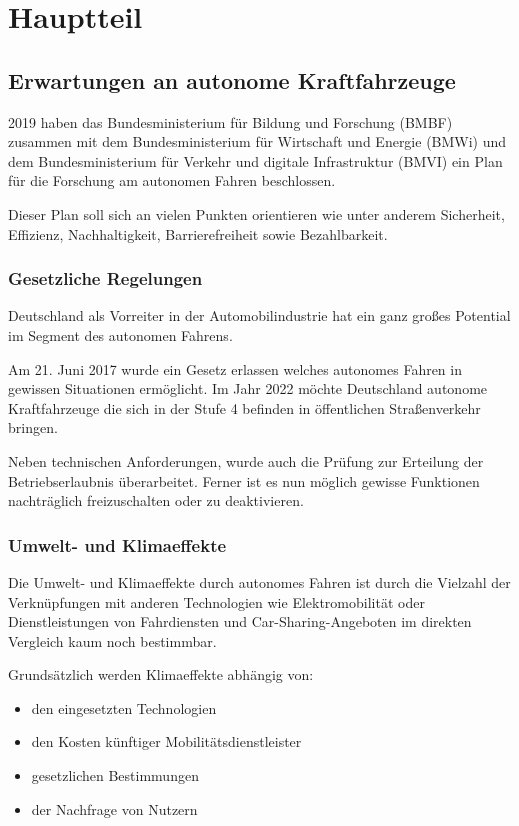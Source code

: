 \chapter{Hauptteil}



\section{Erwartungen an autonome Kraftfahrzeuge}
2019 haben das
Bundesministerium für Bildung und Forschung (BMBF) zusammen mit dem
Bundesministerium für Wirtschaft und Energie (BMWi) und dem
Bundesministerium für Verkehr und digitale Infrastruktur (BMVI)
ein Plan für die Forschung am autonomen Fahren beschlossen.

Dieser Plan soll sich an vielen Punkten orientieren wie unter anderem Sicherheit, Effizienz, Nachhaltigkeit, Barrierefreiheit sowie Bezahlbarkeit.

\subsection{Gesetzliche Regelungen}
Deutschland als Vorreiter in der Automobilindustrie hat ein ganz großes Potential im Segment des autonomen Fahrens.

Am 21. Juni 2017 wurde ein Gesetz erlassen welches autonomes Fahren in gewissen Situationen ermöglicht.
Im Jahr 2022 möchte Deutschland autonome Kraftfahrzeuge die sich in der Stufe 4 befinden in öffentlichen Straßenverkehr bringen.

Neben technischen Anforderungen, wurde auch die Prüfung zur Erteilung der Betriebserlaubnis überarbeitet.
Ferner ist es nun möglich gewisse Funktionen nachträglich freizuschalten oder zu deaktivieren.
\cite{gesetztautonomes}

\subsection{Umwelt- und Klimaeffekte}
Die Umwelt- und Klimaeffekte durch autonomes Fahren ist durch die Vielzahl der Verknüpfungen mit anderen Technologien wie Elektromobilität
oder Dienstleistungen von Fahrdiensten und Car-Sharing-Angeboten im direkten Vergleich kaum noch bestimmbar.

Grundsätzlich werden Klimaeffekte abhängig von:
\begin{itemize}
	\item den eingesetzten Technologien
	\item den Kosten künftiger Mobilitätsdienstleister
	\item gesetzlichen Bestimmungen
	\item der Nachfrage von Nutzern
\end{itemize}

